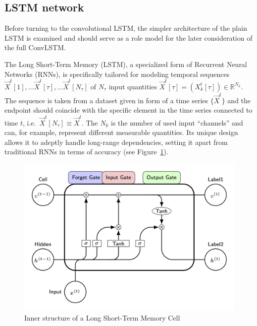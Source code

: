 \documentclass[
]{agujournal2019}
\begin{document}
\hypertarget{lstm-network}{%
\subsection{LSTM network}\label{lstm-network}}

Before turning to the convolutional LSTM, the simpler architecture of
the plain LSTM is examined and should serve as a role model for the
later consideration of the full ConvLSTM.

The Long Short-Term Memory (LSTM), a specialized form of Recurrent
Neural Networks (RNNs), is specifically tailored for modeling temporal
sequences
\(\vec{X}^t[1], \ldots \vec{X}^t[\tau],\ldots \vec{X}^t[N_\tau]\) of
\(N_\tau\) input quantities
\(\vec{X}^t[\tau] = (X^t_k[\tau]) \in \mathbb{R}^{N_k}\). The sequence
is taken from a dataset given in form of a time series \(\{\vec{X}^t\}\)
and the endpoint should coincide with the specific element in the time
series connected to time \(t\),
i.e.~\(\vec{X}^t[N_\tau] \equiv \vec{X}^t\). The \(N_k\) is the number
of used input ``channels'' and can, for example, represent different
measurable quantities. Its unique design allows it to adeptly handle
long-range dependencies, setting it apart from traditional RNNs in terms
of accuracy (see Figure~\ref{fig-lstm}).

\begin{figure}

{\centering \includegraphics{draw_lstm.png}

}

\caption{\label{fig-lstm}Inner structure of a Long Short-Term Memory
Cell}

\end{figure}
\end{document}
